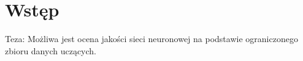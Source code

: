\chapter{Wstęp}
Teza: Możliwa jest ocena jakości sieci neuronowej na podstawie ograniczonego zbioru danych uczących.